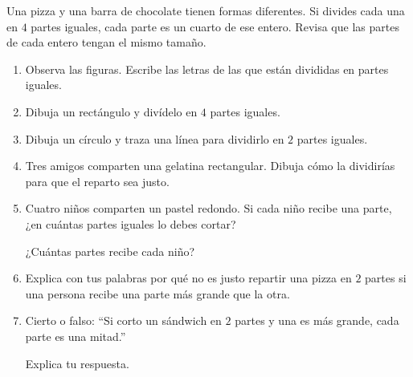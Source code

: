 \begin{wbtip}
Una pizza y una barra de chocolate tienen formas diferentes. Si divides cada una en $4$ partes iguales, cada parte es un cuarto de ese entero. Revisa que las partes de cada entero tengan el mismo tamaño.
\end{wbtip}

\begin{wbpractice}
\begin{enumerate}
\item Observa las figuras. Escribe las letras de las que están divididas en partes iguales.

\begin{center}
\end{center}


\item Dibuja un rectángulo y divídelo en $4$ partes iguales.

\wbbox[3cm]

\item Dibuja un círculo y traza una línea para dividirlo en $2$ partes iguales.

\wbbox[3cm]

\item Tres amigos comparten una gelatina rectangular. Dibuja cómo la dividirías para que el reparto sea justo.

\wbbox[3cm]

\item Cuatro niños comparten un pastel redondo. Si cada niño recibe una parte, ¿en cuántas partes iguales lo debes cortar? \wbblank

¿Cuántas partes recibe cada niño? \wbblank

\item Explica con tus palabras por qué no es justo repartir una pizza en $2$ partes si una persona recibe una parte más grande que la otra.


\item Cierto o falso: ``Si corto un sándwich en $2$ partes y una es más grande, cada parte es una mitad.'' \wbblank[3cm]

Explica tu respuesta.

\end{enumerate}
\end{wbpractice}

